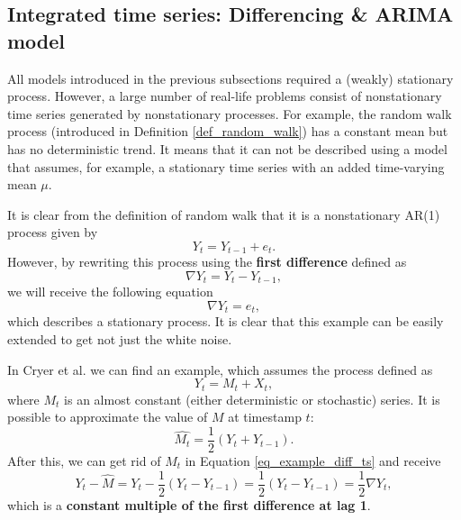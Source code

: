 \subsection{Integrated time series: Differencing \& ARIMA model}

All models introduced in the previous subsections required a (weakly) stationary process. However, a large number of real-life problems consist of nonstationary time series generated by nonstationary processes. For example, the random walk process (introduced in Definition \ref{def_random_walk}) has a constant mean but has no deterministic trend. It means that it can not be described using a model that assumes, for example, a stationary time series with an added time-varying mean $\mu$.

It is clear from the definition of random walk that it is a nonstationary AR(1) process given by
\begin{equation}
    Y_t = Y_{t-1} + e_t.
\end{equation}
However, by rewriting this process using the \textbf{first difference} defined as
\begin{equation}
    \nabla Y_t = Y_t - Y_{t-1},
\end{equation}
we will receive the following equation
\begin{equation}
    \nabla Y_t = e_t,
\end{equation}
which describes a stationary process. It is clear that this example can be easily extended to get not just the white noise.

In Cryer et al. \cite{cryer2008time} we can find an example, which assumes the process defined as \begin{equation}
    Y_t = M_t + X_t,
\label{eq_example_diff_ts}
\end{equation}
where $M_t$ is an almost constant (either deterministic or stochastic) series. It is possible to approximate the value of $M$ at timestamp $t$: \begin{equation}
    \hat{M_t} = \frac{1}{2}(Y_t + Y_{t-1}).
\end{equation} After this, we can get rid of $M_t$ in Equation \ref{eq_example_diff_ts} and receive \begin{equation}
    Y_t - \hat{M} = Y_t - \frac{1}{2}(Y_t - Y_{t-1}) = \frac{1}{2}(Y_t - Y_{t-1}) = \frac{1}{2}\nabla Y_t,
\end{equation}
which is a \textbf{constant multiple of the first difference at lag 1}.

